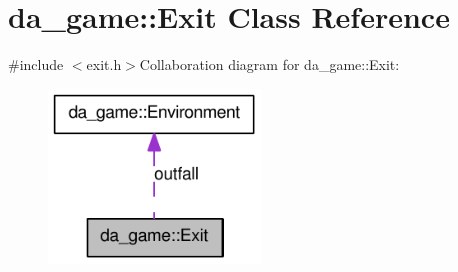 \hypertarget{classda__game_1_1Exit}{
\section{da\_\-game::Exit Class Reference}
\label{classda__game_1_1Exit}
}


{\ttfamily \#include $<$exit.h$>$}Collaboration diagram for da\_\-game::Exit:\nopagebreak
\begin{figure}[H]
\begin{center}
\leavevmode
\includegraphics[width=160pt]{classda__game_1_1Exit__coll__graph}
\end{center}
\end{figure}

